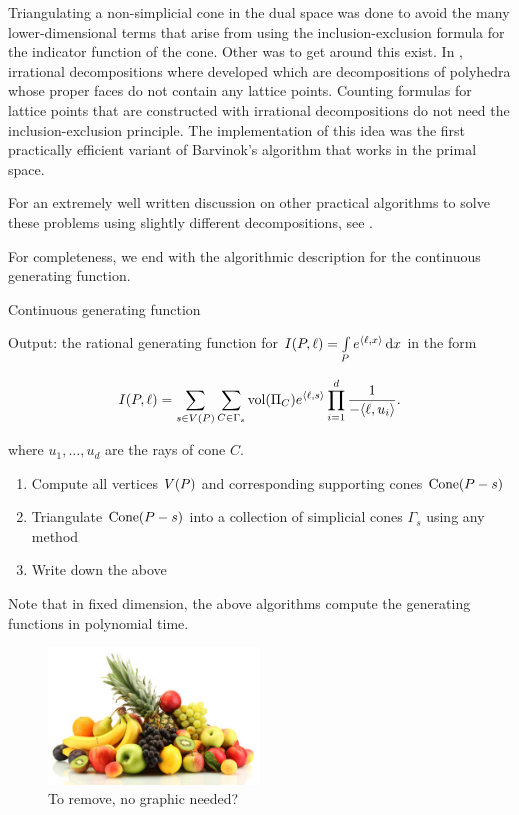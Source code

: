 Triangulating a non-simplicial cone in the dual space was done to avoid the many lower-dimensional terms that arise from using the inclusion-exclusion formula for the indicator function of the cone. Other was to get around this exist. In \cite{koeppe:irrational-barvinok, beck-sottile:irrational, beck-haase-sottile:theorema}, irrational decompositions where developed which are decompositions of polyhedra whose proper faces do not contain any lattice points. Counting formulas for lattice points that are constructed with irrational decompositions do not need the inclusion-exclusion principle. The implementation of this idea \cite{latte-macchiato} was the first practically efficient variant of Barvinok’s algorithm that works in the primal space.


For an extremely well written discussion on other practical algorithms to solve these problems using slightly different decompositions, see \cite{koeppe:irrational-barvinok}. 


For completeness, we end with the algorithmic description for the continuous generating function. 

\begin{algorithm}
\caption{Continuous generating function}

\begin{justify}
Output: the rational generating function for $I({ P}, \ell) = \int\limits_{{ P}} e^{\langle \ell, x \rangle}\,\mathrm{d} x$ in the form

\[ I({ P},\ell) = \sum_{s \in V({ P})} \sum_{C \in \Gamma_s} \text{vol} (\Pi_C)e^{{\langle} \ell, s {\rangle}} \prod_{i=1}^d \frac{1}{-{\langle} \ell, u_i {\rangle}}. \]

where $u_1, \dots, u_d$ are the rays of cone $C$.
\end{justify}
\begin{enumerate}
\item  Compute all vertices $V({ P})$ and corresponding supporting cones $\operatorname{Cone}({ P} - s)$
\item Triangulate $\operatorname{Cone}({ P} - s)$ into a collection of simplicial cones $\Gamma_s$ using any method
\item Write down the above
\end{enumerate}
\end{algorithm} 
 

Note that in fixed dimension, the above algorithms compute the generating functions in polynomial time. 
   
   
   \begin{figure}[h!]
  \caption{To remove, no graphic needed?}
  \centering
    \includegraphics[width=0.5\textwidth]{figures/fruit.jpg}
\end{figure}
   
